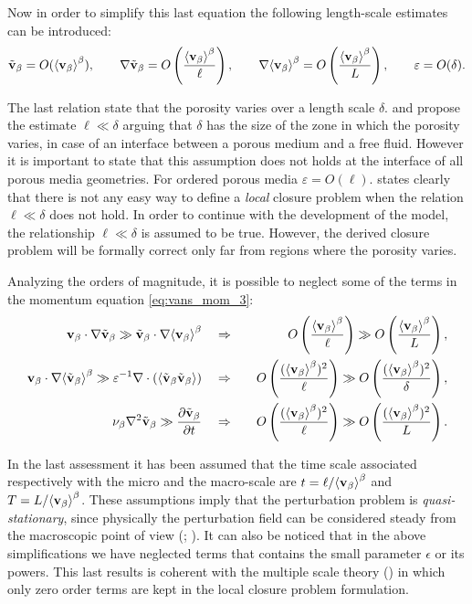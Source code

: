 Now in order to simplify this last equation the following length-scale estimates can be introduced:
$$ \tilde{\textbf{v}}_{\beta} = O({\left< \textbf{v}_{\beta} \right>}^{\beta}), \qquad \nabla\tilde{\textbf{v}}_{\beta} = O \left(\dfrac{{\left< \textbf{v}_{\beta} \right>}^{\beta}}{\ell} \right), \qquad  \nabla {\left< \textbf{v}_{\beta}\right>}^{\beta} = O\left(\dfrac{{\left< \textbf{v}_{\beta} \right>}^{\beta}}{L}\right), \qquad \varepsilon = O(\delta). $$

The last relation state that the porosity varies over a length scale $\delta$. \citet{valdes2013velocity} and \citet{ochoa1995momentum} propose the estimate $\ell \ll \delta$ arguing that $\delta$ has the size of the zone in which the porosity varies, in case of an interface between a porous medium and a free fluid.
However it is important to state that this assumption does not holds at the interface of all porous media geometries. For ordered porous media $\varepsilon = O(\ell)$.
\citet{whitaker1996forchheimer} states clearly that there is not any easy way to define a \textit{local} closure problem when the relation $\ell \ll \delta$ does not hold.
In order to continue with the development of the model, the relationship $\ell \ll \delta$ is assumed to be true. However, the derived closure problem will be formally correct only far from regions where the porosity varies.

Analyzing the orders of magnitude, it is possible to neglect some of the terms in the momentum equation \eqref{eq:vans_mom_3}:
\begin{eqnarray}
\textbf{v}_{\beta} \cdot \nabla \tilde{\textbf{v}}_{\beta} \gg \tilde{\textbf{v}}_{\beta} \cdot \nabla {\left< \textbf{v}_{\beta}\right>}^{\beta} \quad &\Rightarrow&  \quad O\left(\dfrac{{\left< \textbf{v}_{\beta} \right>}^{\beta}}{\ell}\right) \gg O\left(\dfrac{{\left< \textbf{v}_{\beta} \right>}^{\beta}}{L} \right), \\
\textbf{v}_{\beta} \cdot \nabla {\left< \tilde{\textbf{v}}_{\beta}\right>}^{\beta} \gg  \varepsilon^{-1} \nabla \cdot \left({\left< \tilde{\textbf{v}}_{\beta} \tilde{\textbf{v}}_{\beta} \right>}\right)  \quad &\Rightarrow& \quad O\left(\dfrac{({\left< \textbf{v}_{\beta} \right>}^{\beta})^2}{\ell}\right) \gg O\left(\dfrac{({\left< \textbf{v}_{\beta} \right>}^{\beta})^2}{\delta} \right), \label{eq:sbs}\\
\nu_{\beta} \nabla^2 \tilde{\textbf{v}}_{\beta} \gg  \dfrac{\partial \tilde{\textbf{v}}_{\beta}}{\partial t}  \quad &\Rightarrow&  \quad O\left(\dfrac{({\left< \textbf{v}_{\beta} \right>}^{\beta})^2}{\ell}\right) \gg O\left(\dfrac{({\left< \textbf{v}_{\beta} \right>}^{\beta})^2}{L} \right).
\end{eqnarray}

In the last assessment it has been assumed that the time scale associated respectively with the micro and the macro-scale are $t = \ell/{\left< \textbf{v}_{\beta} \right>}^{\beta}$ and $T =L/{\left< \textbf{v}_{\beta} \right>}^{\beta}$.
These assumptions imply that the perturbation problem is \textit{quasi-stationary}, since physically the perturbation field can be considered steady from the macroscopic point of view (\citet{davit2013homogenization}; \citet{zhu2014study}).
It can also be noticed that in the above simplifications we have neglected terms that contains the small parameter $\epsilon$ or its powers. This last results is coherent with the multiple scale theory (\citet{mei2010homogenization}) in which only zero order terms are kept in the local closure problem formulation.

